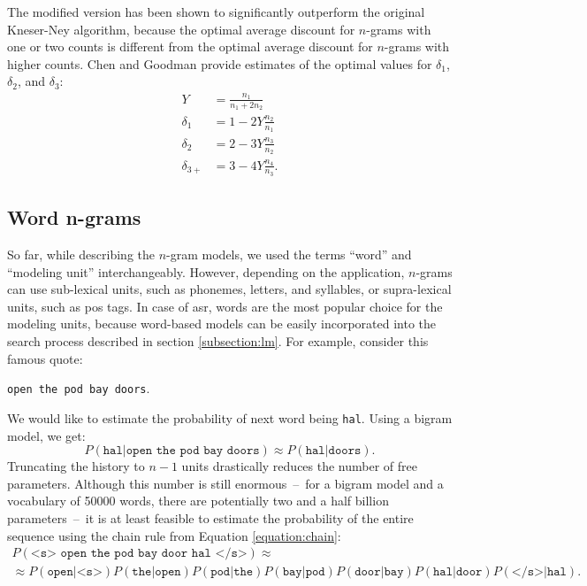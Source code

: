 	The modified version has been shown to significantly outperform the original Kneser-Ney algorithm, because the optimal average discount for \mbox{$n$-grams} with one or two counts is different from the optimal average discount for \mbox{$n$-grams} with higher counts. Chen and Goodman provide estimates of the optimal values for $\delta_{1}$, $\delta_{2}$, and $\delta_{3}$:
	\begin{align}
		Y&=\frac{n_{1}}{n_{1}+2n_{2}} \nonumber\\ 
		\delta_{1}&=1-2Y\frac{n_{2}}{n_{1}} \nonumber\\
		\delta_{2}&=2-3Y\frac{n_{3}}{n_{2}} \nonumber\\
		\delta_{3+}&=3-4Y\frac{n_{4}}{n_{3}}.
	\end{align}
	\subsection{Word n-grams}
	So far, while describing the \mbox{$n$-gram} models, we used the terms ``word'' and ``modeling unit'' interchangeably. However, depending on the application, \mbox{$n$-grams} can use \mbox{sub-lexical} units, such as phonemes, letters, and syllables, or \mbox{supra-lexical} units, such as \gls{pos} tags. In case of \gls{asr}, words are the most popular choice for the modeling units, because \mbox{word-based} models can be easily incorporated into the search process described in section \ref{subsection:lm}. For example, consider this famous quote:
	\begin{center}
		\texttt{open the pod bay doors}.
	\end{center}
	We would like to estimate the probability of next word being \texttt{hal}. Using a bigram model, we get:
	\begin{equation}
		P(\texttt{hal}|\texttt{open the pod bay doors}) \approx P(\texttt{hal}|\texttt{doors}).
	\end{equation}
	Truncating the history to $n-1$ units drastically reduces the number of free parameters. Although this number is still enormous~--~for a bigram model and a vocabulary of 50000 words, there are potentially two and a half billion parameters~--~it is at least feasible to estimate the probability of the entire sequence using the chain rule from Equation \ref{equation:chain}:
	\begin{multline}
		P(\texttt{<s> open the pod bay door hal </s>}) \approx \\
		\approx P(\texttt{open}|\texttt{<s>})P(\texttt{the}|\texttt{open})P(\texttt{pod}|\texttt{the})P(\texttt{bay}|\texttt{pod})P(\texttt{door}|\texttt{bay})P(\texttt{hal}|\texttt{door})P(\texttt{</s>}|\texttt{hal}).
	\end{multline}
